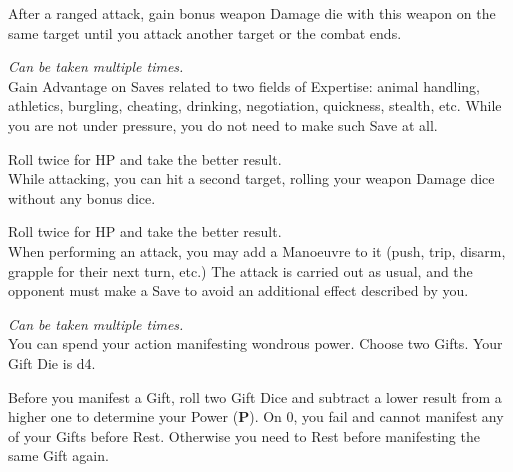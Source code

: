 \documentclass[itdr]{subfiles}
\begin{document}
\vfill
{}
After a ranged attack, gain bonus weapon Damage die with this weapon on the same target until you attack another target or the combat ends.

\vfill
{}
 {\slshape Can be taken multiple times.}\\
Gain Advantage on Saves related to two fields of \mbox{Expertise}: animal handling, athletics, burgling, cheating, drinking, negotiation, quickness, stealth, etc. While you are not under pressure, you do not need to make such Save at all.

\break

 Roll twice for HP and take the better result.\\
While attacking, you can hit a second target, rolling your weapon Damage dice without any bonus dice.

\vfill
{}
 Roll twice for HP and take the better result.\\
When performing an attack, you may add a Manoeuvre to it (push, trip, disarm, grapple for their next turn, etc.) The attack is carried out as usual, and the opponent must make a Save to avoid an additional effect described by you.

\vfill
{}
 {\slshape Can be taken multiple times.}\\
You can spend your action manifesting wondrous power. Choose two Gifts. Your Gift Die is d4.

Before you manifest a Gift, roll two Gift Dice and subtract a lower result from a higher one to determine your Power (\textbf{P}). On 0, you fail and cannot manifest any of your Gifts before Rest. Otherwise you need to Rest before manifesting the same Gift again.
\end{document}
